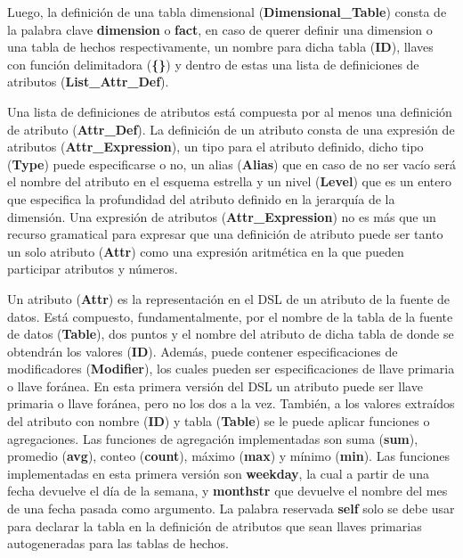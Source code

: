 Luego, la 
definición de una tabla dimensional (\textbf{Dimensional\_Table}) consta de la palabra clave \textbf{dimension} o \textbf{fact}, 
en caso de querer definir una dimension o una tabla de hechos respectivamente, un nombre para dicha tabla 
(\textbf{ID}), llaves con función delimitadora (\textbf{\{\}}) y dentro de estas una lista de definiciones de atributos
(\textbf{List\_Attr\_Def}). 

Una lista de definiciones de atributos est\'a compuesta por al menos una definición de atributo (\textbf{Attr\_Def}). 
La definición de un atributo consta de una expresión de atributos (\textbf{Attr\_Expression}), un tipo para el atributo 
definido, dicho tipo (\textbf{Type}) puede especificarse o no, un alias (\textbf{Alias}) que en caso de no ser vacío ser\'a el nombre del 
atributo en el esquema estrella y un nivel (\textbf{Level}) que es un entero que especifica la profundidad 
del atributo definido en la jerarquía de la dimensión. Una expresión de atributos (\textbf{Attr\_Expression}) no es m\'as que 
un recurso gramatical para expresar que una definición de atributo puede ser tanto un solo atributo (\textbf{Attr})
como una expresión aritmética en la que pueden participar atributos y n\'umeros. 

Un atributo (\textbf{Attr}) es la representación en el DSL de un atributo de la fuente de datos. Est\'a compuesto, 
fundamentalmente, 
por el nombre de la tabla de la fuente de datos (\textbf{Table}), dos puntos y el nombre del atributo de dicha tabla 
de donde se obtendrán los valores (\textbf{ID}). Además, puede contener especificaciones de modificadores (\textbf{Modifier}), 
los cuales pueden ser especificaciones de llave primaria o llave for\'anea. En esta primera versión del 
DSL un atributo puede ser llave primaria o llave for\'anea, pero no los dos a la vez. También, a los valores
extra\'idos del atributo con nombre (\textbf{ID}) y tabla (\textbf{Table}) se le puede aplicar funciones o agregaciones. Las 
funciones de agregación implementadas son suma (\textbf{sum}), promedio (\textbf{avg}), conteo (\textbf{count}), máximo (\textbf{max}) y 
mínimo (\textbf{min}). Las funciones implementadas en esta primera versión son \textbf{weekday}, la cual a partir de 
una fecha devuelve el d\'ia de la semana, y \textbf{monthstr} que devuelve el nombre del mes de una fecha pasada 
como argumento. La palabra reservada \textbf{self} solo se debe usar para declarar la tabla en la definición de atributos 
que sean llaves primarias autogeneradas para las tablas de hechos.

